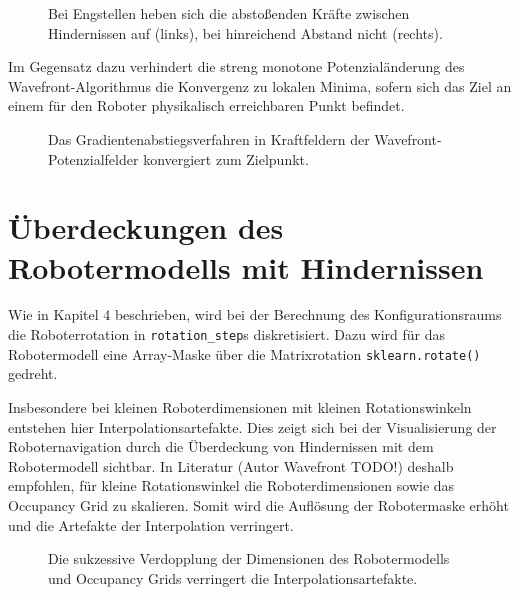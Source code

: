 \begin{figure}[h!]
\begin{minipage}{0.46\textwidth}
	\end{minipage}
	\hspace*{\fill}
	\label{fig:oscillation}
	\caption{Bei Engstellen heben sich die abstoßenden Kräfte zwischen Hindernissen auf (links), bei hinreichend Abstand nicht (rechts).}
\end{figure}

Im Gegensatz dazu verhindert die streng monotone Potenzialänderung des Wavefront-Algorithmus die Konvergenz zu lokalen Minima, sofern sich das Ziel an einem für den Roboter physikalisch erreichbaren Punkt befindet.
\begin{figure}[h!]
	\footnotesize
	\centering
	\centerline{}
	\caption{Das Gradientenabstiegsverfahren in Kraftfeldern der Wavefront-Potenzialfelder konvergiert zum Zielpunkt.}
\end{figure}

\section{Überdeckungen des Robotermodells mit Hindernissen}

Wie in Kapitel 4 beschrieben, wird bei der Berechnung des Konfigurationsraums die Roboterrotation in \texttt{rotation\_step}s diskretisiert. Dazu wird für das Robotermodell eine Array-Maske über die Matrixrotation \texttt{sklearn.rotate()} gedreht. 

Insbesondere bei kleinen Roboterdimensionen mit kleinen Rotationswinkeln entstehen hier Interpolationsartefakte.
Dies zeigt sich bei der Visualisierung der Roboternavigation durch die Überdeckung von Hindernissen mit dem Robotermodell sichtbar. In Literatur (Autor Wavefront TODO!) deshalb empfohlen, für kleine Rotationswinkel die Roboterdimensionen sowie das Occupancy Grid zu skalieren.
Somit wird die Auflösung der Robotermaske erhöht und die Artefakte der Interpolation verringert.

\begin{figure}[h!]
	\footnotesize
	\centering
	\centerline{}
	\caption{Die sukzessive Verdopplung der Dimensionen des Robotermodells und Occupancy Grids verringert die Interpolationsartefakte.}
\end{figure}







